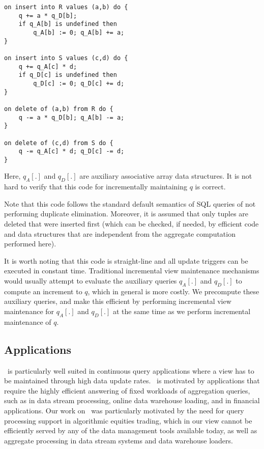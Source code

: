\begin{example}
\begin{Verbatim}
on insert into R values (a,b) do {
    q += a * q_D[b];
    if q_A[b] is undefined then
        q_A[b] := 0; q_A[b] += a;
}

on insert into S values (c,d) do {
    q += q_A[c] * d;
    if q_D[c] is undefined then
        q_D[c] := 0; q_D[c] += d;
}

on delete of (a,b) from R do {
    q -= a * q_D[b]; q_A[b] -= a;
}

on delete of (c,d) from S do {
    q -= q_A[c] * d; q_D[c] -= d;
}

\end{Verbatim}
Here, $q_A[.]$ and $q_D[.]$ are auxiliary associative array data
structures.  It is not hard to verify that this code for incrementally
maintaining $q$ is correct.

Note that this code follows the standard default semantics of SQL queries of not
performing duplicate elimination. Moreover, it is assumed that only tuples are
deleted that were inserted first (which can be checked, if needed, by efficient
code and data structures that are independent from the aggregate computation
performed here).

It is worth noting that this code is straight-line and all update triggers can
be executed in constant time. Traditional incremental view maintenance
mechanisms would usually attempt to evaluate the auxiliary queries $q_A[.]$ and
$q_D[.]$ to compute an increment to $q$, which in general is more costly.  We
precompute these auxiliary queries, and make this efficient by performing
incremental view maintenance for $q_A[.]$ and $q_D[.]$ at the same time as we
perform incremental maintenance of $q$.
\end{example}



\subsection{Applications}


\compiler\ is particularly well suited in continuous query applications where a
view has to be maintained through high data update rates. \compiler\ is
motivated by applications that require the highly efficient answering of fixed
workloads of aggregation queries, such as in data stream processing, online data
warehouse loading, and in financial applications. Our work on \compiler\ was
particularly motivated by the need for query processing support in algorithmic
equities trading, which in our view cannot be efficiently served by any of the
data management tools available today, as well as aggregate processing in data
stream systems and data warehouse loaders.


